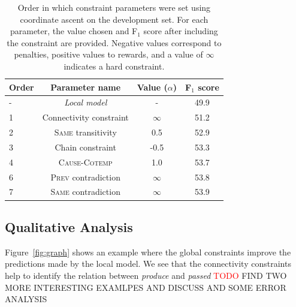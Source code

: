 
\begin{table}[t]
{\footnotesize
\begin{tabular}{| l | c | c | c |}
\hline
    \textbf{Order} & \textbf{Parameter name} & \textbf{Value} ($\alpha$)& \textbf{F$_1$ score} \\
\hline
\hline
- & \emph{Local model} & - & 49.9 \\
1 & Connectivity constraint & $\infty$ & 51.2 \\
2 & \textsc{Same} transitivity &  0.5 & 52.9 \\
3 & Chain constraint & -0.5 & 53.3\\
4 & \textsc{Cause}-\textsc{Cotemp} & 1.0 & 53.7\\
6 & \textsc{Prev} contradiction & $\infty$ & 53.8\\
7 & \textsc{Same} contradiction & $\infty$ & 53.9\\

\hline
\end{tabular}}
\caption{Order in which constraint parameters were set using coordinate ascent on the development set. For each parameter, the value chosen and F$_1$ score after including the constraint are provided. Negative values correspond to penalties, positive values to rewards, and a value of $\infty$ indicates a hard constraint.}
\label{tab:paramtuning}
\end{table}

\subsection{Qualitative Analysis} \label{subsec:analysis}

Figure~\ref{fig:graph} shows an example where the global constraints improve the predictions made by the local model. We see that the connectivity constraints help to identify the relation between \emph{produce} and \emph{passed} \textcolor{red}{TODO} FIND TWO MORE INTERESTING EXAMLPES AND DISCUSS AND SOME ERROR ANALYSIS